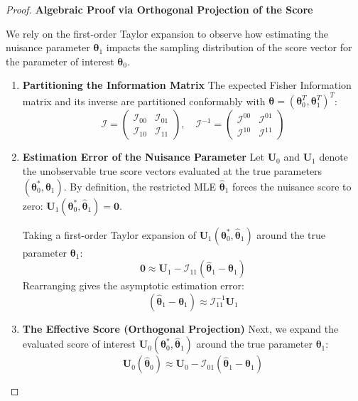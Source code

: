 \documentclass[
  letterpaper,
  DIV=11,
  numbers=noendperiod]{scrreprt}
\renewcommand{\[}{\begin{equation}}
\renewcommand{\]}{\end{equation}}
\theoremstyle{definition}
\theoremstyle{plain}
\theoremstyle{plain}
\theoremstyle{plain}
\theoremstyle{definition}
\theoremstyle{plain}
\theoremstyle{remark}
\begin{document}
\begin{proof}
\textbf{Algebraic Proof via Orthogonal Projection of the Score}

We rely on the first-order Taylor expansion to observe how estimating
the nuisance parameter \(\boldsymbol{\theta}_1\) impacts the sampling
distribution of the score vector for the parameter of interest
\(\boldsymbol{\theta}_0\).

\begin{enumerate}
\def\labelenumi{\arabic{enumi}.}
\item
  \textbf{Partitioning the Information Matrix} The expected Fisher
  Information matrix and its inverse are partitioned conformably with
  \(\boldsymbol{\theta} = (\boldsymbol{\theta}_0^T, \boldsymbol{\theta}_1^T)^T\):
  \[\mathcal{I} = \begin{pmatrix} \mathcal{I}_{00} & \mathcal{I}_{01} \\ \mathcal{I}_{10} & \mathcal{I}_{11} \end{pmatrix}, \quad \mathcal{I}^{-1} = \begin{pmatrix} \mathcal{I}^{00} & \mathcal{I}^{01} \\ \mathcal{I}^{10} & \mathcal{I}^{11} \end{pmatrix}\]
\item
  \textbf{Estimation Error of the Nuisance Parameter} Let
  \(\mathbf{U}_0\) and \(\mathbf{U}_1\) denote the unobservable true
  score vectors evaluated at the true parameters
  \((\boldsymbol{\theta}_0^*, \boldsymbol{\theta}_1)\). By definition,
  the restricted MLE \(\hat{\boldsymbol{\theta}}_1\) forces the nuisance
  score to zero:
  \(\mathbf{U}_1(\boldsymbol{\theta}_0^*, \hat{\boldsymbol{\theta}}_1) = \mathbf{0}\).

  Taking a first-order Taylor expansion of
  \(\mathbf{U}_1(\boldsymbol{\theta}_0^*, \hat{\boldsymbol{\theta}}_1)\)
  around the true parameter \(\boldsymbol{\theta}_1\):
  \[\mathbf{0} \approx \mathbf{U}_1 - \mathcal{I}_{11} (\hat{\boldsymbol{\theta}}_1 - \boldsymbol{\theta}_1)\]
  Rearranging gives the asymptotic estimation error:
  \[(\hat{\boldsymbol{\theta}}_1 - \boldsymbol{\theta}_1) \approx \mathcal{I}_{11}^{-1} \mathbf{U}_1\]
\item
  \textbf{The Effective Score (Orthogonal Projection)} Next, we expand
  the evaluated score of interest
  \(\mathbf{U}_0(\boldsymbol{\theta}_0^*, \hat{\boldsymbol{\theta}}_1)\)
  around the true parameter \(\boldsymbol{\theta}_1\):
  \[\mathbf{U}_0(\hat{\boldsymbol{\theta}}_0) \approx \mathbf{U}_0 - \mathcal{I}_{01} (\hat{\boldsymbol{\theta}}_1 - \boldsymbol{\theta}_1)\]


\end{enumerate}
\end{proof}
\end{document}
